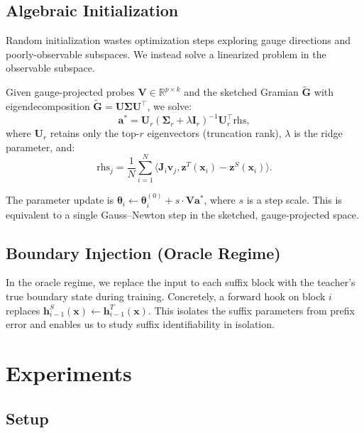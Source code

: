 \documentclass{article}
\newcommand{\R}{\mathbb{R}}
\newcommand{\btheta}{\boldsymbol{\theta}}
\newcommand{\bz}{\mathbf{z}}
\newcommand{\bh}{\mathbf{h}}
\newcommand{\bx}{\mathbf{x}}
\newcommand{\bJ}{\mathbf{J}}
\newcommand{\bG}{\mathbf{G}}
\newcommand{\bV}{\mathbf{V}}
\newcommand{\bU}{\mathbf{U}}
\newcommand{\bI}{\mathbf{I}}
\newcommand{\inner}[2]{\langle #1, #2 \rangle}
\begin{document}
\subsection{Algebraic Initialization}
\label{sec:alg-init}

Random initialization wastes optimization steps exploring gauge directions and poorly-observable subspaces. We instead solve a linearized problem in the observable subspace.

Given gauge-projected probes $\bV \in \R^{p \times k}$ and the sketched Gramian $\tilde{\bG}$ with eigendecomposition $\tilde{\bG} = \bU \boldsymbol{\Sigma} \bU^\top$, we solve:
\begin{equation}\label{eq:alg-init}
    \mathbf{a}^* = \bU_r (\boldsymbol{\Sigma}_r + \lambda \bI_r)^{-1} \bU_r^\top \text{rhs},
\end{equation}
where $\bU_r$ retains only the top-$r$ eigenvectors (truncation rank), $\lambda$ is the ridge parameter, and:
\begin{equation}
    \text{rhs}_j = \frac{1}{N}\sum_{i=1}^{N} \inner{\bJ_i \mathbf{v}_j}{\bz^T(\bx_i) - \bz^S(\bx_i)}.
\end{equation}

The parameter update is $\btheta_i \leftarrow \btheta_i^{(0)} + s \cdot \bV \mathbf{a}^*$, where $s$ is a step scale. This is equivalent to a single Gauss--Newton step in the sketched, gauge-projected space.

\subsection{Boundary Injection (Oracle Regime)}
\label{sec:boundary}

In the oracle regime, we replace the input to each suffix block with the teacher's true boundary state during training. Concretely, a forward hook on block $i$ replaces $\bh_{i-1}^S(\bx) \leftarrow \bh_{i-1}^T(\bx)$. This isolates the suffix parameters from prefix error and enables us to study suffix identifiability in isolation.


\section{Experiments}
\label{sec:experiments}

\subsection{Setup}
\label{sec:exp-setup}
\end{document}
